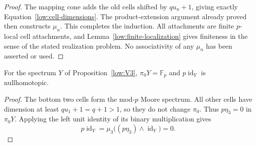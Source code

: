 \begin{proof}
The mapping cone adds the old cells shifted by $qu_n+1$, giving exactly
Equation~\eqref{low:cell-dimensions}.  The product-extension argument
already proved then constructs $\mu_n$.  This completes the induction.
All attachments are finite $p$-local cell attachments, and
Lemma~\ref{low:finite-localization} gives finiteness in the sense of the
stated realization problem.  No associativity of any $\mu_n$ has been
asserted or used.
\end{proof}

\begin{corollary}
\label{low:p-null}
For the spectrum $Y$ of Proposition~\ref{low:V3}, $\pi_0Y=\mathbb F_p$ and
$p\operatorname{id}_Y$ is nullhomotopic.
\end{corollary}

\begin{proof}
The bottom two cells form the mod-$p$ Moore spectrum.  All other cells have
dimension at least $qu_1+1=q+1>1$, so they do not change $\pi_0$.
Thus $p\eta_3=0$ in $\pi_0Y$.  Applying the left unit identity of its
binary multiplication gives
\[
 p\operatorname{id}_Y
  =\mu_3\bigl((p\eta_3)\wedge\operatorname{id}_Y\bigr)=0.
\]
\end{proof}
